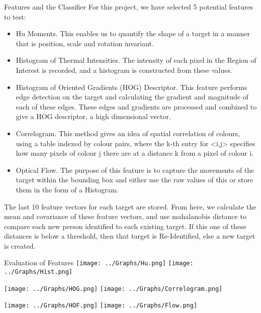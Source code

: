 \documentclass[final]{beamer}
\begin{document}
\begin{frame}{}
\begin{columns}[t]
\begin{column}{.49\linewidth}
        \begin{block}{Features and the Classifier}
        For this project, we have selected 5 potential features to test:
          \begin{itemize}
          \item Hu Moments. 
          This enables us to quantify the shape of a target in a manner that is position, scale and rotation invariant.
          \item Histogram of Thermal Intensities. 
          The intensity of each pixel in the Region of Interest is recorded, and a histogram is constructed from these values.
          \item Histogram of Oriented Gradients (HOG) Descriptor. 
          This feature performs edge detection on the target and calculating the gradient and magnitude of each of these edges. These edges and gradients are processed and combined to give a HOG descriptor, a high dimensional vector. 
          \item Correlogram. 
           This method gives an idea of spatial correlation of colours, using a table indexed by colour pairs, where the k-th entry for <i,j> specifies how many pixels of colour j there are at a distance k from a pixel of colour i.
          \item Optical Flow. 
          The purpose of this feature is to capture the movements of the target within the bounding box and either use the raw values of this or store them in the form of a Histogram.
          \end{itemize}
          The last 10 feature vectors for each target are stored. From here, we calculate the mean and covariance of these feature vectors, and use mahalanobis distance to compare each new person identified to each existing target. If this one of these distances is below a threshold, then that target is Re-Identified, else a new target is created.
        \end{block}
	
        \begin{block}{Evaluation of Features}
		\texttt{[image: ../Graphs/Hu.png]}
		\texttt{[image: ../Graphs/Hist.png]}
		
		\texttt{[image: ../Graphs/HOG.png]}
		\texttt{[image: ../Graphs/Correlogram.png]}
		
		\texttt{[image: ../Graphs/HOF.png]}
		\texttt{[image: ../Graphs/Flow.png]}
		

\end{block}
\end{column}
\end{columns}
\end{frame}
\end{document}
